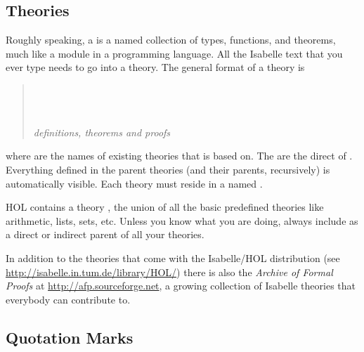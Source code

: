 \begin{isabellebody}
\begin{isamarkuptext}
\subsection{Theories}
\label{sec:Basic:Theories}

Roughly speaking, a  is a named collection of types,
functions, and theorems, much like a module in a programming language.
All the Isabelle text that you ever type needs to go into a theory.
The general format of a theory  is
\begin{quote}
 \\
 \\
\\
\emph{definitions, theorems and proofs}\\
\end{quote}
where  are the names of existing
theories that  is based on. The  are the
direct  of .
Everything defined in the parent theories (and their parents, recursively) is
automatically visible. Each theory  must
reside in a  named .

\begin{warn}
HOL contains a theory , the union of all the basic
predefined theories like arithmetic, lists, sets, etc.
Unless you know what you are doing, always include 
as a direct or indirect parent of all your theories.
\end{warn}

In addition to the theories that come with the Isabelle/HOL distribution
(see \url{http://isabelle.in.tum.de/library/HOL/})
there is also the \emph{Archive of Formal Proofs}
at  \url{http://afp.sourceforge.net}, a growing collection of Isabelle theories
that everybody can contribute to.

\subsection{Quotation Marks}


\end{isamarkuptext}
\end{isabellebody}
